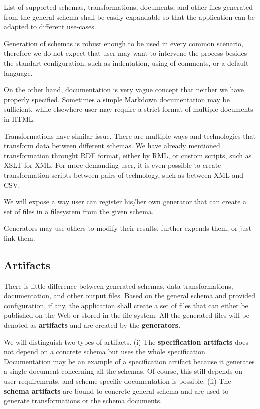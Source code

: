 \begin{requirement}
  List of supported schemas, transformations, documents, and other files generated from the general schema shall be easily expandable so that the application can be adapted to different use-cases.
\end{requirement}

Generation of schemas is robust enough to be used in every common scenario, therefore we do not expect that user may want to intervene the process besides the standart configuration, such as indentation, using of comments, or a default language.

On the other hand, documentation is very vague concept that neither we have properly specified. Sometimes a simple Markdown documentation may be sufficient, while elsewhere user may require a strict format of multiple documents in HTML.

Transformations have similar issue. There are multiple ways and technologies that transform data between different schemas. We have already mentioned transformation throught RDF format, either by RML, or custom scripts, such as XSLT for XML. For more demanding user, it is even possible to create transformation scripts between pairs of technology, such as between XML and CSV.

We will expose a way user can register his/her own generator that can create a set of files in a filesystem from the given schema.

Generators may use others to modify their results, further expends them, or just link them.

\subsection{Artifacts}

There is little difference between generated schemas, data transformations, documentation, and other output files. Based on the general schema and provided configuration, if any, the application shall create a set of files that can either be published on the Web or stored in the file system. All the generated files will be denoted as \textbf{artifacts} and are created by the \textbf{generators}.

We will distinguish two types of artifacts. (i) The \textbf{specification artifacts} does not depend on a concrete schema but uses the whole specification. Documentation may be an example of a specification artifact because it generates a single document concerning all the schemas. Of course, this still depends on user requirements, and scheme-specific documentation is possible. (ii) The \textbf{schema artifacts} are bound to concrete general schema and are used to generate transformations or the schema documents.

